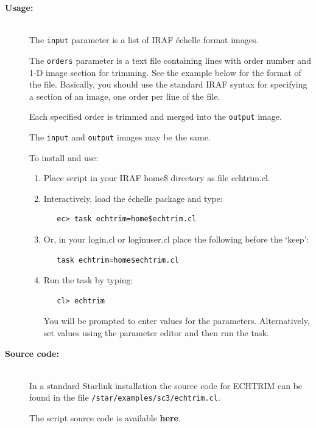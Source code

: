 \documentclass[twoside,11pt]{article}
\newcommand{\htmladdnormallink}[2]{#1}
\newenvironment{latexonly}{}{}
\newcommand{\htmlref}[2]{#1}
\begin{document}
\begin{description}
\item [{\bf Usage:}] \mbox{} \\
     The \verb+input+ parameter is a list of IRAF \'{e}chelle format images.

     The \verb+orders+ parameter is a text file containing lines with order
     number and 1-D image section for trimming.  See the example below
     for the format of the file.  Basically, you should use the standard
     IRAF syntax for specifying a section of an image, one order per line
     of the file.

     Each specified order is trimmed and merged into the \verb+output+ image.

     The \verb+input+ and \verb+output+ images may be the same.

     To install and use:

\begin{enumerate}

\item Place script in your IRAF home\$ directory as file echtrim.cl.

\item Interactively, load the \'{e}chelle package and type:

\begin{verbatim}
   ec> task echtrim=home$echtrim.cl
\end{verbatim}

\item Or, in your login.cl or loginuser.cl place the following before
      the `keep':

\begin{verbatim}
   task echtrim=home$echtrim.cl
\end{verbatim}

\item Run the task by typing:

\begin{verbatim}
   cl> echtrim
\end{verbatim}

      You will be prompted
      to enter values for the parameters. Alternatively, set values
      using the parameter editor and then run the task.
\end{enumerate}

\item [{\bf Source code:}] \mbox{} \\
\begin{latexonly}
In a standard Starlink installation the source code for ECHTRIM can be found
in the file \texttt{/star/examples/sc3/echtrim.cl}.
\end{latexonly}
\begin{htmlonly}
      The script source code is available
      \htmlref{{\bf here}}{se_echtrim_source}.
\end{htmlonly}


\end{description}
\end{document}
